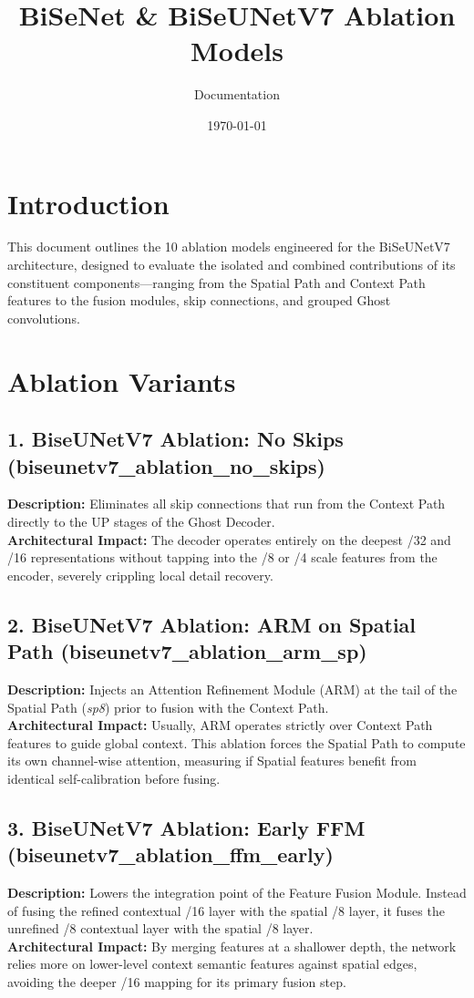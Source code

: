 \documentclass{article}
\title{BiSeNet \& BiSeUNetV7 Ablation Models}
\author{Documentation}
\date{\today}
\begin{document}
\maketitle

\section{Introduction}
This document outlines the 10 ablation models engineered for the BiSeUNetV7 architecture, designed to evaluate the isolated and combined contributions of its constituent components---ranging from the Spatial Path and Context Path features to the fusion modules, skip connections, and grouped Ghost convolutions. 

\section{Ablation Variants}

\subsection{1. BiseUNetV7 Ablation: No Skips (biseunetv7\_ablation\_no\_skips)}
\textbf{Description:} Eliminates all skip connections that run from the Context Path directly to the UP stages of the Ghost Decoder. 
\\
\textbf{Architectural Impact:} The decoder operates entirely on the deepest /32 and /16 representations without tapping into the /8 or /4 scale features from the encoder, severely crippling local detail recovery.

\subsection{2. BiseUNetV7 Ablation: ARM on Spatial Path (biseunetv7\_ablation\_arm\_sp)}
\textbf{Description:} Injects an Attention Refinement Module (ARM) at the tail of the Spatial Path (\textit{sp8}) prior to fusion with the Context Path.
\\
\textbf{Architectural Impact:} Usually, ARM operates strictly over Context Path features to guide global context. This ablation forces the Spatial Path to compute its own channel-wise attention, measuring if Spatial features benefit from identical self-calibration before fusing.

\subsection{3. BiseUNetV7 Ablation: Early FFM (biseunetv7\_ablation\_ffm\_early)}
\textbf{Description:} Lowers the integration point of the Feature Fusion Module. Instead of fusing the refined contextual /16 layer with the spatial /8 layer, it fuses the unrefined /8 contextual layer with the spatial /8 layer.
\\
\textbf{Architectural Impact:} By merging features at a shallower depth, the network relies more on lower-level context semantic features against spatial edges, avoiding the deeper /16 mapping for its primary fusion step.
\end{document}
